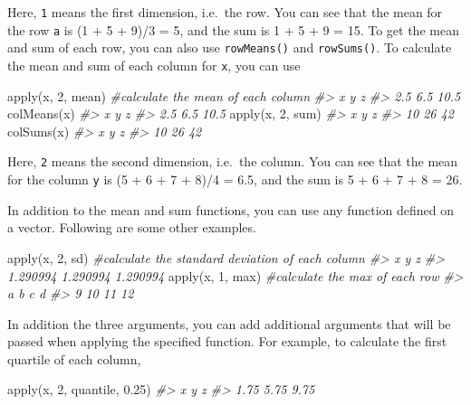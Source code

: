 \documentclass[
]{book}
\newenvironment{Shaded}{\begin{snugshade}}{\end{snugshade}}
\newcommand{\CommentTok}[1]{\textcolor[rgb]{0.56,0.35,0.01}{\textit{#1}}}
\newcommand{\DecValTok}[1]{\textcolor[rgb]{0.00,0.00,0.81}{#1}}
\newcommand{\FloatTok}[1]{\textcolor[rgb]{0.00,0.00,0.81}{#1}}
\newcommand{\FunctionTok}[1]{\textcolor[rgb]{0.00,0.00,0.00}{#1}}
\newcommand{\NormalTok}[1]{#1}
\begin{document}
Here, \texttt{1} means the first dimension, i.e.~the row. You can see that the mean for the row \texttt{a} is (1 + 5 + 9)/3 = 5, and the sum is 1 + 5 + 9 = 15. To get the mean and sum of each row, you can also use \texttt{rowMeans()} and \texttt{rowSums()}. To calculate the mean and sum of each column for \texttt{x}, you can use

\begin{Shaded}
\begin{Highlighting}[]
\FunctionTok{apply}\NormalTok{(x, }\DecValTok{2}\NormalTok{, mean)   }\CommentTok{\#calculate the mean of each column}
\CommentTok{\#\textgreater{}    x    y    z }
\CommentTok{\#\textgreater{}  2.5  6.5 10.5}
\FunctionTok{colMeans}\NormalTok{(x)}
\CommentTok{\#\textgreater{}    x    y    z }
\CommentTok{\#\textgreater{}  2.5  6.5 10.5}
\FunctionTok{apply}\NormalTok{(x, }\DecValTok{2}\NormalTok{, sum)}
\CommentTok{\#\textgreater{}  x  y  z }
\CommentTok{\#\textgreater{} 10 26 42}
\FunctionTok{colSums}\NormalTok{(x)}
\CommentTok{\#\textgreater{}  x  y  z }
\CommentTok{\#\textgreater{} 10 26 42}
\end{Highlighting}
\end{Shaded}

Here, \texttt{2} means the second dimension, i.e.~the column. You can see that the mean for the column \texttt{y} is (5 + 6 + 7 + 8)/4 = 6.5, and the sum is 5 + 6 + 7 + 8 = 26.

In addition to the mean and sum functions, you can use any function defined on a vector. Following are some other examples.

\begin{Shaded}
\begin{Highlighting}[]
\FunctionTok{apply}\NormalTok{(x, }\DecValTok{2}\NormalTok{, sd)     }\CommentTok{\#calculate the standard deviation of each column}
\CommentTok{\#\textgreater{}        x        y        z }
\CommentTok{\#\textgreater{} 1.290994 1.290994 1.290994}
\FunctionTok{apply}\NormalTok{(x, }\DecValTok{1}\NormalTok{, max)    }\CommentTok{\#calculate the max of each row}
\CommentTok{\#\textgreater{}  a  b  c  d }
\CommentTok{\#\textgreater{}  9 10 11 12}
\end{Highlighting}
\end{Shaded}

In addition the three arguments, you can add additional arguments that will be passed when applying the specified function. For example, to calculate the first quartile of each column,

\begin{Shaded}
\begin{Highlighting}[]
\FunctionTok{apply}\NormalTok{(x, }\DecValTok{2}\NormalTok{, quantile, }\FloatTok{0.25}\NormalTok{)}
\CommentTok{\#\textgreater{}    x    y    z }
\CommentTok{\#\textgreater{} 1.75 5.75 9.75}
\end{Highlighting}
\end{Shaded}
\end{document}

